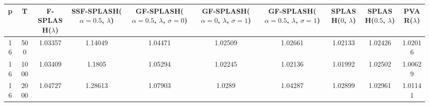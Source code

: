 \begin{tabular}{cccccccccc}
\hline
  p  &  T   &  F-SPLASH($\lambda$)  &  SSF-SPLASH($\alpha=0.5$, $\lambda$)  &  GF-SPLASH($\alpha=0.5$, $\lambda$, $\sigma=0$)  &  GF-SPLASH($\alpha=0$, $\lambda$, $\sigma=1$)  &  GF-SPLASH($\alpha=0.5$, $\lambda$, $\sigma=1$)  &  SPLASH($0$, $\lambda$)  &  SPLASH($0.5$, $\lambda$)  &  PVAR($\lambda$)  \\
\hline
 16  & 500  &        1.03357        &                1.14049                &                     1.04471                      &                    1.02509                     &                     1.02661                      &         1.02133          &          1.02426           &      1.02016      \\
 16  & 1000 &        1.03409        &                1.1805                 &                     1.05294                      &                    1.02245                     &                     1.02136                      &         1.01992          &          1.02502           &      1.00629      \\
 16  & 2000 &        1.04727        &                1.28613                &                     1.07903                      &                     1.0289                     &                     1.04287                      &         1.02899          &          1.02961           &      1.01141      \\
\hline
\end{tabular}